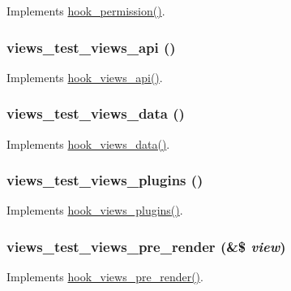 \label{views__test_8module_a5768b933d9689c113d322f2904be336a}
Implements \hyperlink{group__hooks_ga2b22b45f4925f2478412477bae329713}{hook\_\-permission()}. \hypertarget{views__test_8module_afc691cec43665bc3c566210bf1a5cdbd}{
\subsubsection[{views\_\-test\_\-views\_\-api}]{\setlength{\rightskip}{0pt plus 5cm}views\_\-test\_\-views\_\-api ()}}
\label{views__test_8module_afc691cec43665bc3c566210bf1a5cdbd}
Implements \hyperlink{group__views__hooks_gac67ffd4a2f61f9814ee37b541c472c47}{hook\_\-views\_\-api()}. \hypertarget{views__test_8module_a97293d465c8d574b6be39b11d79f1a13}{
\subsubsection[{views\_\-test\_\-views\_\-data}]{\setlength{\rightskip}{0pt plus 5cm}views\_\-test\_\-views\_\-data ()}}
\label{views__test_8module_a97293d465c8d574b6be39b11d79f1a13}
Implements \hyperlink{group__views__hooks_ga227057901681e4a33e33c199c7a8c989}{hook\_\-views\_\-data()}. \hypertarget{views__test_8module_a1d92c7f29f0341731c7a9d4d5468f888}{
\subsubsection[{views\_\-test\_\-views\_\-plugins}]{\setlength{\rightskip}{0pt plus 5cm}views\_\-test\_\-views\_\-plugins ()}}
\label{views__test_8module_a1d92c7f29f0341731c7a9d4d5468f888}
Implements \hyperlink{group__views__hooks_ga23f6e9972b2ed84fc54b7ff63f44477d}{hook\_\-views\_\-plugins()}. \hypertarget{views__test_8module_ae5532b352f8358a411334ad3e1bb654f}{
\subsubsection[{views\_\-test\_\-views\_\-pre\_\-render}]{\setlength{\rightskip}{0pt plus 5cm}views\_\-test\_\-views\_\-pre\_\-render (\&\$ {\em view})}}
\label{views__test_8module_ae5532b352f8358a411334ad3e1bb654f}
Implements \hyperlink{group__views__hooks_gab88d5c49ec4ad30dba2be34327d5b0cc}{hook\_\-views\_\-pre\_\-render()}. 